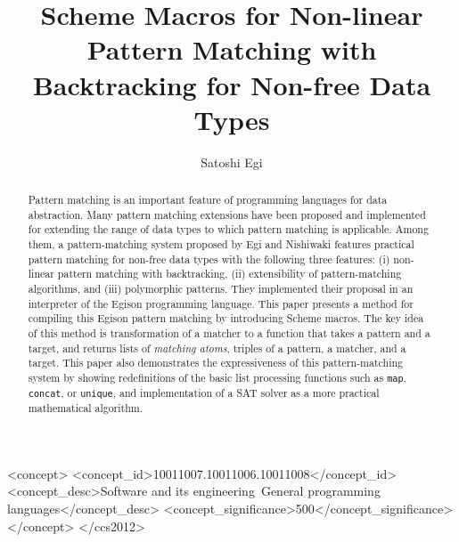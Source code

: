 \documentclass[acmlarge]{acmart}
\begin{document}
\setlength{\pdfpageheight}{\paperheight}
\setlength{\pdfpagewidth}{\paperwidth}

\title{Scheme Macros for Non-linear Pattern Matching with Backtracking for Non-free Data Types}

\author{Satoshi Egi}

\begin{abstract}
  Pattern matching is an important feature of programming languages for data abstraction.
  Many pattern matching extensions have been proposed and implemented for extending the range of data types to which pattern matching is applicable.
  Among them, a pattern-matching system proposed by Egi and Nishiwaki features practical pattern matching for non-free data types with the following three features: (i) non-linear pattern matching with backtracking, (ii) extensibility of pattern-matching algorithms, and (iii) polymorphic patterns.
  They implemented their proposal in an interpreter of the Egison programming language.
  This paper presents a method for compiling this Egison pattern matching by introducing Scheme macros.
  The key idea of this method is transformation of a matcher to a function that takes a pattern and a target, and returns lists of \emph{matching atoms}, triples of a pattern, a matcher, and a target.
  This paper also demonstrates the expressiveness of this pattern-matching system by showing redefinitions of the basic list processing functions such as \texttt{map}, \texttt{concat}, or \texttt{unique}, and implementation of a SAT solver as a more practical mathematical algorithm.
  
\end{abstract}

\begin{CCSXML}
<concept>
<concept_id>10011007.10011006.10011008</concept_id>
<concept_desc>Software and its engineering~General programming languages</concept_desc>
<concept_significance>500</concept_significance>
</concept>
</ccs2012>
\end{CCSXML}

\end{document}

